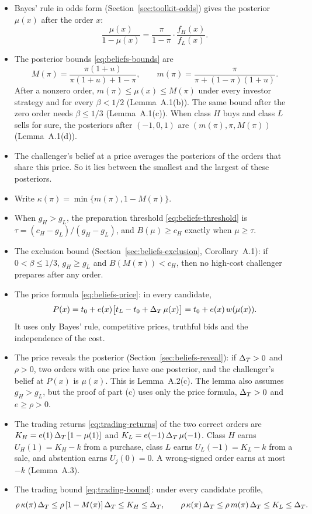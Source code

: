 \begin{itemize}
\item Bayes' rule in odds form (Section~\ref{sec:toolkit-odds}) gives the posterior \(\mu(x)\) after the order \(x\):
  \[
  \frac{\mu(x)}{1-\mu(x)}=\frac{\pi}{1-\pi}\cdot\frac{f_H(x)}{f_L(x)}.
  \]
\item The posterior bounds \eqref{eq:beliefs-bounds} are
  \[
  M(\pi)=\frac{\pi(1+u)}{\pi(1+u)+1-\pi},\qquad m(\pi)=\frac{\pi}{\pi+(1-\pi)(1+u)}.
  \]
  After a nonzero order, \(m(\pi)\le\mu(x)\le M(\pi)\) under every investor strategy and for every \(\beta<1/2\)
  (Lemma~A.1(b)). The same bound after the zero order needs \(\beta\le1/3\) (Lemma~A.1(c)). When class \(H\) buys
  and class \(L\) sells for sure, the posteriors after \((-1,0,1)\) are \((m(\pi),\pi,M(\pi))\) (Lemma~A.1(d)).
\item The challenger's belief at a price averages the posteriors of the orders that share this price. So it lies
  between the smallest and the largest of these posteriors.
\item Write \(\kappa(\pi)=\min\{m(\pi),1-M(\pi)\}\).
\item When \(g_H>g_L\), the preparation threshold \eqref{eq:beliefs-threshold} is \(\tau=(c_H-g_L)/(g_H-g_L)\), and
  \(B(\mu)\ge c_H\) exactly when \(\mu\ge\tau\).
\item The exclusion bound (Section~\ref{sec:beliefs-exclusion}, Corollary~A.1): if \(0<\beta\le1/3\),
  \(g_H\ge g_L\) and \(B(M(\pi))<c_H\), then no high-cost challenger prepares after any order.
\item The price formula \eqref{eq:beliefs-price}: in every candidate,
  \[
  P(x)=t_0+e(x)\bigl[t_L-t_0+\Delta_T\,\mu(x)\bigr]=t_0+e(x)\,w(\mu(x)).
  \]
  It uses only Bayes' rule, competitive prices, truthful bids and the independence of the cost.
\item The price reveals the posterior (Section~\ref{sec:beliefs-reveal}): if \(\Delta_T>0\) and \(\rho>0\), two orders
  with one price have one posterior, and the challenger's belief at \(P(x)\) is \(\mu(x)\). This is Lemma~A.2(c).
  The lemma also assumes \(g_H>g_L\), but the proof of part (c) uses only the price formula, \(\Delta_T>0\) and
  \(e\ge\rho>0\).
\item The trading returns \eqref{eq:trading-returns} of the two correct orders are
  \(K_H=e(1)\,\Delta_T\,[1-\mu(1)]\) and \(K_L=e(-1)\,\Delta_T\,\mu(-1)\). Class \(H\) earns \(U_H(1)=K_H-k\) from a purchase,
  class \(L\) earns \(U_L(-1)=K_L-k\) from a sale, and abstention earns \(U_j(0)=0\). A wrong-signed order earns at
  most \(-k\) (Lemma~A.3).
\item The trading bound \eqref{eq:trading-bound}: under every candidate profile,
  \[
  \rho\,\kappa(\pi)\,\Delta_T\le\rho\,[1-M(\pi)]\,\Delta_T\le K_H\le\Delta_T,\qquad
  \rho\,\kappa(\pi)\,\Delta_T\le\rho\,m(\pi)\,\Delta_T\le K_L\le\Delta_T.
  \]
\end{itemize}

